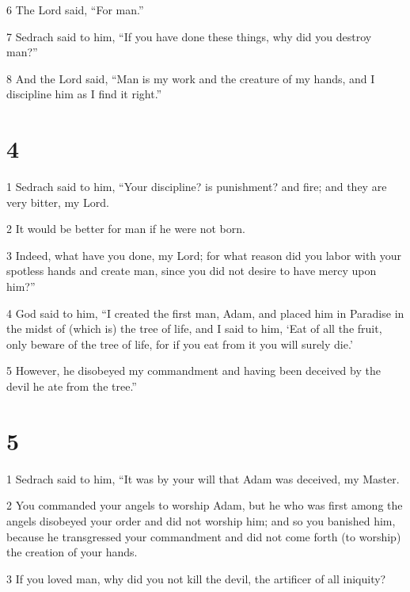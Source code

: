\par 6 The Lord said, “For man.” 

\par 7 Sedrach said to him, “If you have done these things, why did you destroy man?” 

\par 8 And the Lord said, “Man is my work and the creature of my hands, and I discipline him as I find it right.” 

\chapter{4}

\par 1 Sedrach said to him, “Your discipline? is punishment? and fire; and they are very bitter, my Lord. 

\par 2 It would be better for man if he were not born. 

\par 3 Indeed, what have you done, my Lord; for what reason did you labor with your spotless hands and create man, since you did not desire to have mercy upon him?” 

\par 4 God said to him, “I created the first man, Adam, and placed him in Paradise in the midst of (which is) the tree of life, and I said to him, ‘Eat of all the fruit, only beware of the tree of life, for if you eat from it you will surely die.’ 

\par 5 However, he disobeyed my commandment and having been deceived by the devil he ate from the tree.” 

\chapter{5}

\par 1 Sedrach said to him, “It was by your will that Adam was deceived, my Master. 

\par 2 You commanded your angels to worship Adam, but he who was first among the angels disobeyed your order and did not worship him; and so you banished him, because he transgressed your commandment and did not come forth (to worship) the creation of your hands. 

\par 3 If you loved man, why did you not kill the devil, the artificer of all iniquity? 

